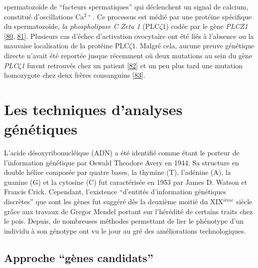 \documentclass[12pt,twoside]{reedthesis}
\theoremstyle{definition}
\theoremstyle{definition}
\theoremstyle{remark}
\begin{document}
\begin{enumerate}
    spermatozoïde de ``facteurs spermatiques'' qui déclenchent un signal
    de calcium, constitué d'oscillations Ca\(^{2+}\). Ce processus est
    médié par une protéine spécifique du spermatozoïde, \emph{la
    phospholipase C Zeta 1} (PLC\(\zeta 1\)) codée par le gène
    \emph{PLCZ1} {[}\protect\hyperlink{ref-Nomikos2013}{80},
    \protect\hyperlink{ref-Amdani2013}{81}{]}. Plusieurs cas d'échec
    d'activation ovocytaire ont été liés à l'absence ou la mauvaise
    localisation de la protéine PLC\(\zeta1\). Malgré cela, aucune preuve
    génétique directe n'avait été reportée jusque récemment où deux
    mutations au sein du gène \emph{PLC}\(\zeta\)\emph{1} furent retrouvés
    chez un patient {[}\protect\hyperlink{ref-Heytens2009}{82}{]} et un
    peu plus tard une mutation homozygote chez deux frères consanguins
    {[}\protect\hyperlink{ref-Escoffier2016}{83}{]}.
  \end{enumerate}
  
  \newpage  
  
  \section{Les techniques d'analyses
  génétiques}\label{les-techniques-danalyses-genetiques}
  
  L'acide désoxyribonucléique (ADN) a été identifié comme étant le porteur
  de l'information génétique par Oswald Theodore Avery en 1944. Sa
  structure en double hélice composée par quatre bases, la thymine (T),
  l'adénine (A), la guanine (G) et la cytosine (C) fut caractérisée en
  1953 par James D. Watson et Francis Crick. Cependant, l'existence
  ``d'entités d'information génétiques discrètes'' que sont les gènes fut
  suggéré dès la deuxième moitié du XIX\(^{ième}\) siècle grâce aux
  travaux de Gregor Mendel portant sur l'hérédité de certains traits chez
  le pois. Depuis, de nombreuses méthodes permettant de lier le phénotype
  d'un individu à son génotype ont vu le jour au gré des améliorations
  technologiques.
  
  \subsection{\texorpdfstring{Approche ``gènes
  candidats''}{Approche gènes candidats}}\label{approche-genes-candidats}
  
\end{document}
